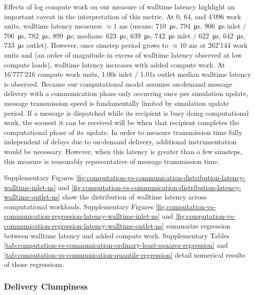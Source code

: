 Effects of log compute work on our measure of walltime latency highlight an important caveat in the interpretation of this metric.
At 0, 64, and 4'096 work units, walltime latency measures $\approx 1$ ms (means: \SI{710}{\micro\second}, \SI{794}{\micro\second}, \SI{906}{\micro\second} inlet / \SI{706}{\micro\second}, \SI{782}{\micro\second}, \SI{899}{\micro\second}; medians: \SI{623}{\micro\second}, \SI{639}{\micro\second}, \SI{742}{\micro\second} inlet / \SI{622}{\micro\second}, \SI{642}{\micro\second}, \SI{733}{\micro\second} outlet).
However, once simstep period grows to $\approx 10$ ms at 262'144 work units and (an order of magnitude in excess of walltime latency observed at low compute loads), walltime latency increases with added compute work.
At 16'777'216 compute work units, 1.00s inlet / 1.01s outlet median walltime latency is observed.
Because our computational model assumes on-demand message delivery with a communication phase only occurring once per simulation update, message transmission speed is fundamentally limited by simulation update period.
If a message is dispatched while its recipient is busy doing computational work, the soonest it can be received will be when that recipient completes the computational phase of its update.
In order to measure transmission time fully independent of delays due to on-demand delivery, additional instrumentation would be necessary.
However, when this latency is greater than a few simsteps, this measure is reasonably representative of message transmission time.

Supplementary Figures \ref{fig:computation-vs-communication-distribution-latency-walltime-inlet-ns} and \ref{fig:computation-vs-communication-distribution-latency-walltime-outlet-ns} show the distribution of walltime latency across computational workloads.
Supplementary Figures \ref{fig:computation-vs-communication-regression-latency-walltime-inlet-ns} and \ref{fig:computation-vs-communication-regression-latency-walltime-outlet-ns} summarize regression between walltime latency and added compute work.
Supplementary Tables \ref{tab:computation-vs-communication-ordinary-least-squares-regression} and \ref{tab:computation-vs-communication-quantile-regression} detail numerical results of those regressions.

\subsubsection{Delivery Clumpiness}

